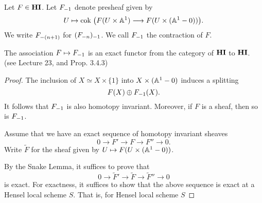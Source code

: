
\begin{defn}
Let $F \in \HI$. Let $\RHI{F}$ denote presheaf given by
\[
U \mapsto \cok\big( F(U \times \A^1) \to 
   F(U \times (\A^1 - 0))\big).
\]
We write $\RHI[(n + 1)]{F}$ for $\RHI{(\RHI[n]{F})}$. We call 
$\RHI{F}$ the contraction of $F$.
\end{defn}

\begin{prop}\label{prop_contract_is_exact}
The association $F \mapsto \RHI{F}$ is an exact functor from
the category of $\HI$ to $\HI$. (see \cite{MVW} Lecture 23, and
\cite{DegGenMot} Prop. 3.4.3)
\end{prop}

\begin{proof}
The inclusion of $X \simeq X \times \{1\}$ into $X \times 
(\A^1 - 0)$ induces a splitting
\[
F(X) \oplus \RHI{F}(X).
\]
It follows that $\RHI{F}$ is also homotopy invariant. Moreover,
if $F$ is a sheaf, then so is $\RHI{F}$.

Assume that we have an exact sequence of homotopy invariant 
sheaves
\[
0 \to F' \to F \to F'' \to 0.
\]
Write $\tilde{F}$ for the sheaf given by $U \mapsto F(U \times 
(\A^1 - 0))$.

By the Snake Lemma, it suffices to prove that
\[
0 \to \tilde{F}' \to \tilde{F} \to \tilde{F}'' \to 0
\]
is exact. For exactness, it suffices to show that the above 
sequence is exact at a Hensel local scheme $S$. That is, for
Hensel local scheme $S$

\end{proof}
